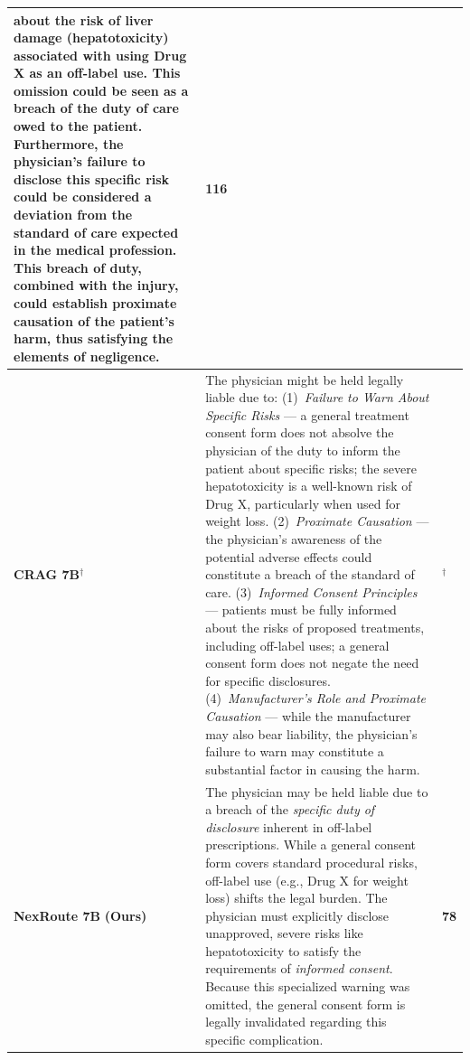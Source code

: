 \documentclass[a4paper,fleql]{cas-sc}
\begin{document}
\begin{center}
\begin{tabular}{m{2.3cm} | m{10.0cm} | >{\centering\arraybackslash}m{1.5cm}}
about the risk of liver damage (hepatotoxicity) associated with using Drug X as
an off-label use. This omission could be seen as a breach of the duty of care
owed to the patient. Furthermore, the physician's failure to disclose this
specific risk could be considered a deviation from the standard of care
expected in the medical profession. This breach of duty, combined with the
injury, could establish proximate causation of the patient's harm, thus
satisfying the elements of negligence. & 116 \\
\midrule
\textbf{CRAG 7B}$^\dagger$
& The physician might be held legally liable due to:
(1)~\textit{Failure to Warn About Specific Risks} --- a general treatment
consent form does not absolve the physician of the duty to inform the patient
about specific risks; the severe hepatotoxicity is a well-known risk of Drug X,
particularly when used for weight loss.
(2)~\textit{Proximate Causation} --- the physician's awareness of the potential
adverse effects could constitute a breach of the standard of care.
(3)~\textit{Informed Consent Principles} --- patients must be fully informed
about the risks of proposed treatments, including off-label uses; a general
consent form does not negate the need for specific disclosures.
(4)~\textit{Manufacturer's Role and Proximate Causation} --- while the
manufacturer may also bear liability, the physician's failure to warn may
constitute a substantial factor in causing the harm. & 256$^\dagger$ \\
\midrule
\textbf{NexRoute 7B} \newline \small\textbf{(Ours)}
& The physician may be held liable due to a breach of the \textit{specific duty
of disclosure} inherent in off-label prescriptions. While a general consent
form covers standard procedural risks, off-label use (e.g., Drug X for weight
loss) shifts the legal burden. The physician must explicitly disclose
unapproved, severe risks like hepatotoxicity to satisfy the requirements of
\textit{informed consent}. Because this specialized warning was omitted, the
general consent form is legally invalidated regarding this specific
complication. & \textbf{78} \\
\bottomrule
\end{tabular}
\endgroup
\end{center}
\vspace{6pt plus 4pt minus 3pt}

\vspace{6pt plus 4pt minus 3pt}

\newpage 
\end{document}
